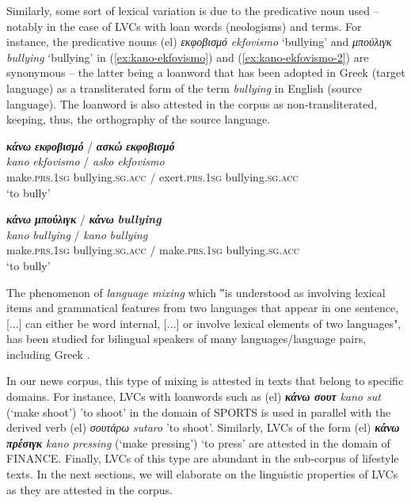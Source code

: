 \documentclass[output=paper,colorlinks,citecolor=brown]{langscibook}
\begin{document}
Similarly, some sort of lexical variation is due to the predicative noun used – notably in the case of LVCs with loan words (neologisms) and terms. For instance, the predicative nouns (el) \textit{εκφοβισμό} \textit{ekfovismo} `bullying' and \textit{μπούλιγκ} \textit{bullying} `bullying' in (\ref{ex:kano-ekfovismo}) and (\ref{ex:kano-ekfovismo-2}) are synonymous -- the latter being a loanword that has been adopted in Greek (target language) as a transliterated form of the term \textit{bullying} in English (source language). The loanword is also attested in the corpus as non-transliterated, keeping, thus, the orthography of the source language.

\ea
 \label{ex:kano-ekfovismo}
 \settowidth {}
 \glll
 \textbf{\em{κάνω}} \textbf{\em{εκφοβισμό}} / \textbf{\em{ασκώ}} \textbf{\em{εκφοβισμό}}\\ 
\textit{kano} \textit{ekfovismo} / \textit{asko} \textit{ekfovismo} \\
make.\textsc{prs.1sg} bullying.\textsc{sg.acc} / exert.\textsc{prs.1sg} bullying.\textsc{sg.acc} \\
\glt `to bully' \\
\z

\ea
 \label{ex:kano-ekfovismo-2}
 \settowidth {}
 \glll
 \textbf{\em{κάνω}} \textbf{\em{μπούλιγκ}} / \textbf{\em{κάνω}} \textbf{\em{bullying}}\\ 
\textit{kano} \textit{bullying} / \textit{kano} \textit{bullying} \\
make.\textsc{prs.1sg} bullying.\textsc{sg.acc} / make.\textsc{prs.1sg} bullying.\textsc{sg.acc} \\
\glt `to bully' \\
\z

The phenomenon of \textit{language mixing} which ‟is understood as involving lexical items and grammatical features from two languages that appear in one sentence, [...] can either be word internal, [...] or involve lexical elements of two languages", has been studied for bilingual speakers of many languages/language pairs, including Greek \citet[166]{Alexiadou-2017}. 


In our news corpus, this type of mixing is attested in texts that belong to specific domains. For instance, LVCs with loanwords such as (el) \textbf{\em{κάνω σουτ}} \textit{kano sut} (`make shoot') 'to shoot' in the domain of SPORTS is used in parallel with the derived verb (el) \textit{σουτάρω} \textit{sutaro} 'to shoot'. Similarly, LVCs of the form (el) \textbf{\em{κάνω πρέσιγκ}} \textit{kano pressing} (`make pressing') `to press' are attested in the domain of FINANCE. Finally, LVCs of this type are abundant in the sub-corpus of lifestyle texts.
In the next sections, we will elaborate on the linguistic properties of LVCs as they are attested in the corpus.
\end{document}
